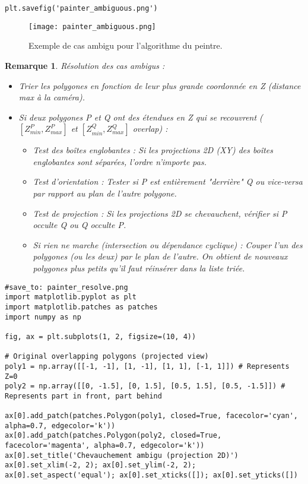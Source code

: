 \documentclass{article}
\newtheorem{remark}{Remarque}
\begin{document}
{\begin{verbatim}
plt.savefig('painter_ambiguous.png')
\end{verbatim}

\begin{figure}[H]
\centering
\texttt{[image: painter\_ambiguous.png]}
\caption{Exemple de cas ambigu pour l'algorithme du peintre.}
\label{fig:painter_ambiguous}
\end{figure}

\begin{remark}
Résolution des cas ambigus :
\begin{itemize}
    \item Trier les polygones en fonction de leur plus grande coordonnée en Z (distance max à la caméra).
    \item Si deux polygones P et Q ont des étendues en Z qui se recouvrent ($[Z_{min}^P, Z_{max}^P]$ et $[Z_{min}^Q, Z_{max}^Q]$ overlap) :
    \begin{itemize}
        \item Test des boîtes englobantes : Si les projections 2D (XY) des boîtes englobantes sont séparées, l'ordre n'importe pas.
        \item Test d'orientation : Tester si P est entièrement "derrière" Q ou vice-versa par rapport au plan de l'autre polygone.
        \item Test de projection : Si les projections 2D se chevauchent, vérifier si P occulte Q ou Q occulte P.
        \item Si rien ne marche (intersection ou dépendance cyclique) : Couper l'un des polygones (ou les deux) par le plan de l'autre. On obtient de nouveaux polygones plus petits qu'il faut réinsérer dans la liste triée.
    \end{itemize}
\end{itemize}
\end{remark}

\begin{verbatim}
#save_to: painter_resolve.png
import matplotlib.pyplot as plt
import matplotlib.patches as patches
import numpy as np

fig, ax = plt.subplots(1, 2, figsize=(10, 4))

# Original overlapping polygons (projected view)
poly1 = np.array([[-1, -1], [1, -1], [1, 1], [-1, 1]]) # Represents Z=0
poly2 = np.array([[0, -1.5], [0, 1.5], [0.5, 1.5], [0.5, -1.5]]) # Represents part in front, part behind

ax[0].add_patch(patches.Polygon(poly1, closed=True, facecolor='cyan', alpha=0.7, edgecolor='k'))
ax[0].add_patch(patches.Polygon(poly2, closed=True, facecolor='magenta', alpha=0.7, edgecolor='k'))
ax[0].set_title('Chevauchement ambigu (projection 2D)')
ax[0].set_xlim(-2, 2); ax[0].set_ylim(-2, 2); ax[0].set_aspect('equal'); ax[0].set_xticks([]); ax[0].set_yticks([])


\end{verbatim}}
\end{document}
